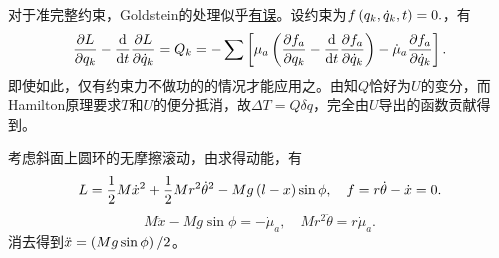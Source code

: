 \documentclass{ctexrep}
\begin{document}
对于准完整约束，Goldstein\cite{Goldstein}的处理似乎\href{https://physics.stackexchange.com/questions/343456/hamiltons-principle-with-semiholonomic-constraints}{有误}。设约束为$ f\left(q_k, \dot{q}_k, t\right)=0. $，有
\[ \frac{\partial L}{\partial q_k} - \frac{\mathrm{d}}{\mathrm{d} t}\frac{\partial L}{\partial \dot{q}_k} = Q_k = -\sum\left[\mu_a\left(\frac{\partial f_a}{\partial q_k}-\frac{\mathrm{d}}{\mathrm{d} t}\frac{\partial f_a}{\partial \dot{q}_k}\right)-\dot{\mu}_a\frac{\partial f_a}{\partial \dot{q}_k}\right]. \]
即使如此，仅有约束力不做功的的情况才能应用之。由知$Q$恰好为$U$的变分，而Hamilton原理要求$T$和$U$的便分抵消，故$\Delta T = Q \delta q$，完全由$U$导出的函数贡献得到。
\begin{ex}
  \label{ex:rollinghoop}
  考虑斜面上圆环的无摩擦滚动，由求得动能，有
  \[ L = \frac{1}{2} M\dot{x}^2 + \frac{1}{2} M r^2 \dot{\theta}^2 - Mg\left(l-x\right)\sin\phi, \quad f = r\dot{\theta} - \dot{x} = 0. \]
  \[ M\ddot{x} - Mg\sin\phi = -\dot{\mu}_a, \quad Mr^2\ddot{\theta} = r\dot{\mu}_a. \]
  消去得到$\ddot{x} = \left(Mg\sin\phi\right)/2$。
\end{ex}
\end{document}

